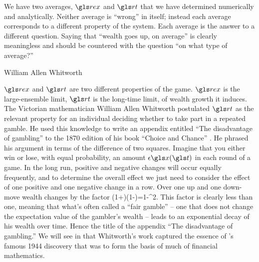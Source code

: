 We have two averages, $\rex$ and $\rt$ that we have determined numerically and analytically. 
Neither average is ``wrong'' in itself; instead each average corresponds to a different property
of the system. Each average is the answer to a different question. Saying that ``wealth 
goes up, on average'' is clearly meaningless and should be countered with the question 
``on what type of average?'' 


\begin{history}{William Allen Whitworth}

$\rex$ and $\rt$ are two different properties of the game. $\rex$ is 
the large-ensemble limit, $\rt$ is the long-time limit, of wealth growth it induces. The Victorian 
mathematician William Allen Whitworth postulated $\rt$ as the relevant property 
for an individual deciding whether to take part in a repeated gamble. 
He used this knowledge to write an appendix  entitled ``The disadvantage 
of gambling'' to the 1870 edition of his book ``Choice and Chance'' 
\cite{Whitworth1870}. He phrased his argument in terms of the difference of two squares. 
Imagine that you either win or lose, with equal probability, 
an amount $\epsilon \x(\t)$ in each round of a game. In the long run, positive and 
negative changes will occur equally frequently, and to determine
the overall effect we just need to consider the effect of one positive and one negative change
in a row. Over one up and one down-move wealth changes by the factor
\be
(1+\epsilon)(1-\epsilon)=1-\epsilon^2.
\ee
This factor is clearly less than one, meaning that what's often called a ``fair gamble'' -- one 
that does not change the expectation value of the gambler's wealth -- leads to an 
exponential decay of his wealth over time. Hence the title of the appendix 
``The disadvantage of gambling.'' We will see in  that Whitworth's work
captured the essence of \Ito's famous 1944 discovery \cite{Ito1944} that was to form the basis of
much of financial mathematics.


\end{history}
